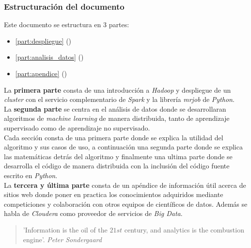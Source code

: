\newpage

\subsubsection*{Estructuración del documento}
Este documento se estructura en 3 partes:
\begin{itemize}
  \item \autoref{part:despliegue} ()
  \item \autoref{part:analisis_datos} ()
  \item \autoref{part:apendice} ()
\end{itemize}
La \textbf{primera parte} consta de una introducción a \textit{Hadoop} y despliegue de un \textit{cluster} con el servicio
complementario de \textit{Spark} y la librería \textit{mrjob} de \textit{Python}.\\
La \textbf{segunda parte} se centra en el análisis de datos donde se desarrollaran algoritmos de 
\textit{machine learning} de manera distribuida, tanto de aprendizaje supervisado como de aprendizaje no supervisado.\\
Cada sección consta de una primera parte donde se explica la utilidad del algoritmo y sus casos de uso, 
a continuación una segunda parte donde se explica las matemáticas detrás del algoritmo y finalmente 
una ultima parte donde se desarrolla el código de manera distribuida con la inclusión del código fuente 
escrito en \textit{Python}.\\
La \textbf{tercera y última parte} consta de un apéndice de información útil acerca de sitios web 
donde poner en practica los conocimientos adquiridos mediante competiciones y colaboración con otros equipos de
científicos de datos. Además se habla de \textit{Cloudera} como proveedor de servicios de \textit{Big Data}.
\newline

\vspace*{1.5cm}

\begin{quote}
    'Information is the oil of the $21st$ century, and analytics is the combustion engine'.
	 \newline \raggedleft \textit{Peter Sondergaard}
\end{quote}

\clearpage
